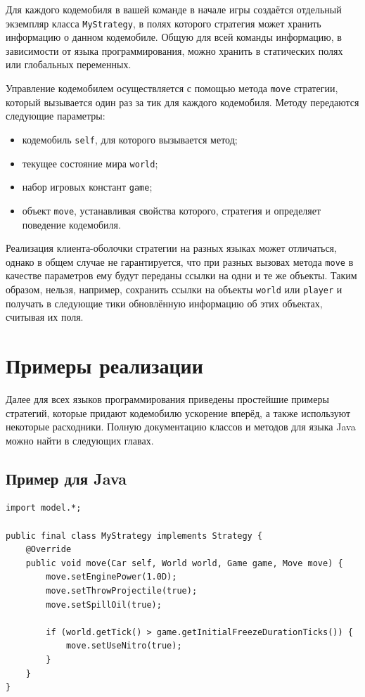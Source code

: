Для каждого кодемобиля в вашей команде в начале игры создаётся отдельный экземпляр класса \texttt{MyStrategy}, в полях которого стратегия
может хранить информацию о данном кодемобиле. Общую для всей команды информацию, в зависимости от языка программирования, можно хранить в
статических полях или глобальных переменных.

Управление кодемобилем осуществляется с помощью метода \texttt{move} стратегии, который вызывается один раз за тик для каждого кодемобиля.
Методу передаются следующие параметры:
\begin{itemize}
  \item кодемобиль \texttt{self}, для которого вызывается метод;
  \item текущее состояние мира \texttt{world};
  \item набор игровых констант \texttt{game};
  \item объект \texttt{move}, устанавливая свойства которого, стратегия и определяет поведение кодемобиля.
\end{itemize}

Реализация клиента-оболочки стратегии на разных языках может отличаться, однако в общем случае не гарантируется, что при разных вызовах
метода \texttt{move} в качестве параметров ему будут переданы ссылки на одни и те же объекты. Таким образом, нельзя, например, сохранить
ссылки на объекты \texttt{world} или \texttt{player} и получать в следующие тики обновлённую информацию об этих объектах, считывая их поля.

\newpage
\section{Примеры реализации}

Далее для всех языков программирования приведены простейшие примеры стратегий, которые придают кодемобилю ускорение вперёд, а также
используют некоторые расходники. Полную документацию классов и методов для языка Java можно найти в следующих главах.

\subsection{Пример для Java}

\begin{verbatim}
import model.*;

public final class MyStrategy implements Strategy {
    @Override
    public void move(Car self, World world, Game game, Move move) {
        move.setEnginePower(1.0D);
        move.setThrowProjectile(true);
        move.setSpillOil(true);

        if (world.getTick() > game.getInitialFreezeDurationTicks()) {
            move.setUseNitro(true);
        }
    }
}
\end{verbatim}

